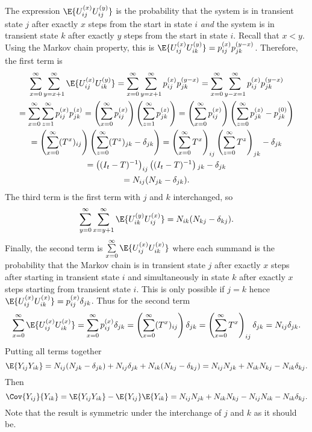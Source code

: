 \documentclass[12pt]{article}
\begin{document}
The expression \( \E{U_{ij}^{(x)} U_{ij}^{(y)}} \) is the probability
that the system is in transient state \( j \) after exactly \( x \)
steps from the start in state \( i \) \emph{and} the system is in
transient state \( k \) after exactly \( y \) steps from the start in
state \( i \).  Recall that \( x < y \). Using the Markov chain
property, this is \( \E{U_{ij}^{(x)} U_{ik}^{(y)}} = p_{ij}^{(x)} p_{jk}^
{(y-x)} \).  Therefore, the first term is
\begin{multline*}
    \sum\limits_{x=0}^{\infty} \sum\limits_{y=x+1}^{\infty} \E{U_{ij}^{(x)}
    U_{ik}^{(y)}} = \sum\limits_{x=0}^{\infty} \sum\limits_{y=x+1}^{\infty}
    p_{ij}^{(x)} p_{jk}^{(y-x)} = \sum\limits_{x=0}^{\infty} \sum\limits_
    {y-x=1}^{\infty} p_{ij}^{(x)} p_{jk}^{(y-x)} \\
    = \sum\limits_{x=0}^{\infty} \sum\limits_{z=1}^{\infty}
    p_{ij}^{(x)} p_{jk}^{(z)} = \left( \sum\limits_{x=0}^{\infty} p_{ij}^
    {(x)} \right) \left( \sum\limits_{z=1}^{\infty} p_{jk}^{(z)} \right)
    = \left( \sum\limits_{x=0}^{\infty} p_{ij}^{(x)} \right) \left( \sum\limits_
    {z=0}^{\infty} p_{jk}^{(z)} - p_{jk}^{(0)}\right) \\
    = \left( \sum\limits_{x=0}^{\infty} (T^x){}_{ij} \right) \left( \sum\limits_
    {z=0}^{\infty} (T^z){}_{jk} - \delta_{jk}\right) = \left( \sum\limits_
    {x=0}^{\infty} T^x \right)_{ij} \left( \sum\limits_{z=0}^{\infty} T^z\right)_
    {jk} - \delta_{jk} \\
    = \left( (I_t-T)^{-1} \right)_{ij} \left( (I_t-T)^{-1} \right){}_{jk}
    - \delta_{jk} \\
    = N_{ij}(N_{jk}-\delta_{jk}).
\end{multline*}
The third term is the first term with \( j \) and \( k \) interchanged,
so
\[
    \sum\limits_{y=0}^{\infty} \sum\limits_{x=y+1}^{\infty} \E{U_{ik}^{(y)}
    U_{ij}^{(x)}} = N_{ik}(N_{kj}-\delta_{kj}).
\] Finally, the second term is \( \sum\limits_{x=0}^{\infty} \E{U_{ij}^{%
(x)} U_{ik}^{(x)}} \) where each summand is the probability that the
Markov chain is in transient state \( j \) after exactly \( x \) steps
after starting in transient state \( i \) and simultaneously in state \(
k \) after exactly \( x \) steps starting from transient state \( i \).
This is only possible if \( j=k \) hence \( \E{U_{ij}^{(x)} U_{ik}^{(x)}}
= p_{ij}^{(x)} \delta_{jk} \).  Thus for the second term
\[
    \sum\limits_{x=0}^{\infty} \E{U_{ij}^{(x)} U_{ik}^{(x)}} = \sum\limits_
    {x=0}^ {\infty} p_{ij}^{(x)} \delta_{jk} = \left( \sum\limits_{x=0}^
    {\infty} (T^ {x}){}_{ij} \right) \delta_{jk} = \left( \sum\limits_{x=0}^
    {\infty} T^{x} \right)_{ij} \delta_{jk} = N_{ij} \delta_{jk}.
\] Putting all terms together
\[
    \E{Y_{ij} Y_{ik}} = N_{ij}(N_{jk}-\delta_{jk}) + N_{ij} \delta_{jk}
    + N_{ik}(N_{kj}-\delta_{kj}) = N_{ij}N_{jk} + N_{ik}N_{kj} - N_{ik}\delta_
    {kj}.
\] Then
\begin{equation}
    \Cov{Y_{ij}}{Y_{ik}} = \E{Y_{ij} Y_{ik}} - \E{Y_{ij}} \E{Y_{ik}} = N_
    {ij}N_{jk} + N_{ik}N_{kj} - N_{ij}N_{ik} - N_{ik}\delta_{kj}.%
    \label{eq:newwaitingtime:cov}
\end{equation}
Note that the result is symmetric under the interchange of \( j \) and \(
k \) as it should be.
\end{document}
